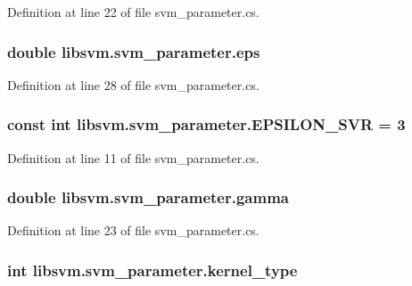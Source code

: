 Definition at line 22 of file svm\_\-parameter.cs.

\hypertarget{classlibsvm_1_1svm__parameter_adcd4c2ba2946d022e3a4d342e2b2da8f}{
\subsubsection[{eps}]{\setlength{\rightskip}{0pt plus 5cm}double {\bf libsvm.svm\_\-parameter.eps}}}
\label{classlibsvm_1_1svm__parameter_adcd4c2ba2946d022e3a4d342e2b2da8f}


Definition at line 28 of file svm\_\-parameter.cs.

\hypertarget{classlibsvm_1_1svm__parameter_ab7601237a153a0e1fa3806107a9a60e6}{
\subsubsection[{EPSILON\_\-SVR}]{\setlength{\rightskip}{0pt plus 5cm}const int {\bf libsvm.svm\_\-parameter.EPSILON\_\-SVR} = 3}}
\label{classlibsvm_1_1svm__parameter_ab7601237a153a0e1fa3806107a9a60e6}


Definition at line 11 of file svm\_\-parameter.cs.

\hypertarget{classlibsvm_1_1svm__parameter_aabbd71665d64cc45e2ed66079cce2b6b}{
\subsubsection[{gamma}]{\setlength{\rightskip}{0pt plus 5cm}double {\bf libsvm.svm\_\-parameter.gamma}}}
\label{classlibsvm_1_1svm__parameter_aabbd71665d64cc45e2ed66079cce2b6b}


Definition at line 23 of file svm\_\-parameter.cs.

\hypertarget{classlibsvm_1_1svm__parameter_af0bd5118e26640a12e80cfea463f6a05}{
\subsubsection[{kernel\_\-type}]{\setlength{\rightskip}{0pt plus 5cm}int {\bf libsvm.svm\_\-parameter.kernel\_\-type}}}
\label{classlibsvm_1_1svm__parameter_af0bd5118e26640a12e80cfea463f6a05}


